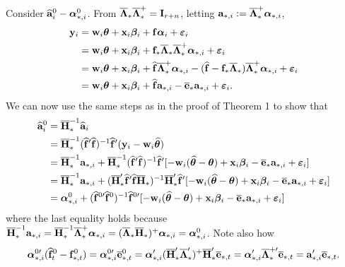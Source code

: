 \documentclass[12pt,fleqn]{article}
\begin{document}
Consider $\widehat{\mathbf{a}}_{i}^{0} - \boldsymbol{\alpha}_{*,i}^0$. From $\overline{\boldsymbol{\Lambda}}_*\overline{\boldsymbol{\Lambda}}_*^+ = \mathbf{I}_{r+n}$, letting $\mathbf{a}_{*,i} := \overline{\boldsymbol{\Lambda}}_*^+\boldsymbol{\alpha}_{*,i}$,
\begin{align}
\mathbf{y}_{i} & = \mathbf{w}_{i}\boldsymbol{\theta} + \mathbf{x}_{i}\boldsymbol{\beta}_i + \mathbf{f}\boldsymbol{\alpha}_i+  \boldsymbol{\varepsilon}_{i} \notag\\
& = \mathbf{w}_{i}\boldsymbol{\theta} + \mathbf{x}_{i}\boldsymbol{\beta}_i + \mathbf{f}_*\overline{\boldsymbol{\Lambda}}_*\overline{\boldsymbol{\Lambda}}_*^+\boldsymbol{\alpha}_{*,i} +  \boldsymbol{\varepsilon}_{i} \notag\\
& = \mathbf{w}_{i}\boldsymbol{\theta} + \mathbf{x}_{i}\boldsymbol{\beta}_i + \widehat{\mathbf{f}}\overline{\boldsymbol{\Lambda}}_*^+\boldsymbol{\alpha}_{*,i} - ( \widehat{\mathbf{f}} -  \mathbf{f}_*\overline{\boldsymbol{\Lambda}}_*)\overline{\boldsymbol{\Lambda}}_*^+\boldsymbol{\alpha}_{*,i}  +  \boldsymbol{\varepsilon}_{i}\notag\\
& = \mathbf{w}_{i}\boldsymbol{\theta} + \mathbf{x}_{i}\boldsymbol{\beta}_i + \widehat{\mathbf{f}}\mathbf{a}_{*,i} - \overline{\mathbf{e}}_*\mathbf{a}_{*,i} +  \boldsymbol{\varepsilon}_{i}.
\end{align}
We can now use the same steps as in the proof of Theorem 1 to show that
\begin{align}
\widehat{\mathbf{a}}_{i}^0 & = \overline{\mathbf{H}}_*^{-1}\widehat{\mathbf{a}}_{i} \notag\\
& = \overline{\mathbf{H}}_*^{-1} (\widehat{\mathbf{f}}'\widehat{\mathbf{f}})^{-1}\widehat{\mathbf{f}}'(\mathbf{y}_{i} - \mathbf{w}_i\widehat{\boldsymbol{\theta}}) \notag\\
& = \overline{\mathbf{H}}_*^{-1}\mathbf{a}_{*,i} + \overline{\mathbf{H}}_*^{-1}(\widehat{\mathbf{f}}'\widehat{\mathbf{f}})^{-1}\widehat{\mathbf{f}}'[ -\mathbf{w}_{i}(\widehat{\boldsymbol{\theta}} - \boldsymbol{\theta}) + \mathbf{x}_{i}\boldsymbol{\beta}_i  - \overline{\mathbf{e}}_*\mathbf{a}_{*,i} +  \boldsymbol{\varepsilon}_{i} ]\notag\\
& = \overline{\mathbf{H}}_*^{-1}\mathbf{a}_{*,i} +  (\overline{\mathbf{H}}_*' \widehat{\mathbf{f}}'\widehat{\mathbf{f}} \overline{\mathbf{H}}_*)^{-1}\overline{\mathbf{H}}_*'\widehat{\mathbf{f}}' [ -\mathbf{w}_{i}(\widehat{\boldsymbol{\theta}} - \boldsymbol{\theta}) + \mathbf{x}_{i}\boldsymbol{\beta}_i  - \overline{\mathbf{e}}_*\mathbf{a}_{*,i} +  \boldsymbol{\varepsilon}_{i} ]\notag\\
& = \boldsymbol{\alpha}_{*,i}^0 + (\widehat{\mathbf{f}}^{0\prime}\widehat{\mathbf{f}}^0)^{-1}\widehat{\mathbf{f}}^{0\prime}[ -\mathbf{w}_{i}(\widehat{\boldsymbol{\theta}} - \boldsymbol{\theta}) + \mathbf{x}_{i}\boldsymbol{\beta}_i  - \overline{\mathbf{e}}_*\mathbf{a}_{*,i} +  \boldsymbol{\varepsilon}_{i} ]
\end{align}
where the last equality holds because $\overline{\mathbf{H}}_*^{-1}\mathbf{a}_{*,i} =\overline{\mathbf{H}}_*^{-1} \overline{\boldsymbol{\Lambda}}_*^+\boldsymbol{\alpha}_{*,i}= ( \overline{\boldsymbol{\Lambda}}_* \overline{\mathbf{H}}_*)^+\boldsymbol{\alpha}_{*,i} = \boldsymbol{\alpha}_{*,i}^0$. Note also how
\begin{align}
\boldsymbol{\alpha}_{*,i}^{0\prime}(\widehat{\mathbf{f}}_{t}^0-\mathbf{f}_{*,t}^0) = \boldsymbol{\alpha}_{*,i}^{0\prime}\overline{\mathbf{e}}_{*,t}^0 = \boldsymbol{\alpha}_{*,i}' (\overline{\mathbf{H}}_*'\overline{\boldsymbol{\Lambda}}_*')^{+}\overline{\mathbf{H}}_*'\overline{\mathbf{e}}_{*,t}= \boldsymbol{\alpha}_{*,i}' \overline{\boldsymbol{\Lambda}}_*^{+\prime}\overline{\mathbf{e}}_{*,t} = \mathbf{a}_{*,i}'\overline{\mathbf{e}}_{*,t}.
\end{align}
\end{document}
